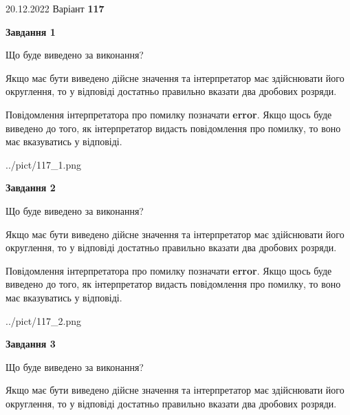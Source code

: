 \documentclass[12pt, ukrainian]{article}
\begin{document}
{20.12.2022 Варіант \No \textbf { 117 }\par}
{
\begin {Large}

{\begin {center}\textbf{Завдання 1}\end {center}}\par
Що буде виведено за виконання? \par

Якщо має бути виведено дійсне значення та інтерпретатор має здійснювати його округлення, 
то у відповіді достатньо правильно вказати два дробових розряди.

Повідомлення інтерпретатора про помилку позначати \textbf{error}.
Якщо щось буде виведено до того, як інтерпретатор видасть повідомлення про помилку, 
то воно має вказуватись у відповіді. \par

\begin{center}
	{../pict/117_1.png}
\end{center}
\newpage

{\begin {center}\textbf{Завдання 2}\end {center}}\par
Що буде виведено за виконання? \par

Якщо має бути виведено дійсне значення та інтерпретатор має здійснювати його округлення, 
то у відповіді достатньо правильно вказати два дробових розряди.

Повідомлення інтерпретатора про помилку позначати \textbf{error}.
Якщо щось буде виведено до того, як інтерпретатор видасть повідомлення про помилку, 
то воно має вказуватись у відповіді. \par

\begin{center}
	{../pict/117_2.png}
\end{center}
\newpage

{\begin {center}\textbf{Завдання 3}\end {center}}\par
Що буде виведено за виконання? \par

Якщо має бути виведено дійсне значення та інтерпретатор має здійснювати його округлення, 
то у відповіді достатньо правильно вказати два дробових розряди.


\end{Large}}
\end{document}
